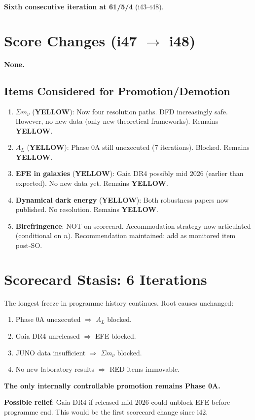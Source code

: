 \documentclass[11pt,a4paper]{article}
\newcommand{\YELLOW}{\textcolor{dfdyellow}{\textbf{YELLOW}}}
\begin{document}
\textbf{Sixth consecutive iteration at 61/5/4} (i43--i48).

\section{Score Changes (i47 $\to$ i48)}

\textbf{None.}

\subsection{Items Considered for Promotion/Demotion}

\begin{enumerate}
\item \textbf{$\Sigma m_\nu$} (\YELLOW): Now four resolution paths. DFD increasingly safe. However, no new data (only new theoretical frameworks). Remains \YELLOW.

\item \textbf{$A_L$} (\YELLOW): Phase 0A still unexecuted (7 iterations). Blocked. Remains \YELLOW.

\item \textbf{EFE in galaxies} (\YELLOW): Gaia DR4 possibly mid 2026 (earlier than expected). No new data yet. Remains \YELLOW.

\item \textbf{Dynamical dark energy} (\YELLOW): Both robustness papers now published. No resolution. Remains \YELLOW.

\item \textbf{Birefringence}: NOT on scorecard. Accommodation strategy now articulated (conditional on $n$). Recommendation maintained: add as monitored item post-SO.
\end{enumerate}

\section{Scorecard Stasis: 6 Iterations}

\begin{tcolorbox}[colback=red!5!white, colframe=red!60!black,
  title={SCORECARD FROZEN FOR 6 ITERATIONS (i43--i48) --- Structural Blockage}]

The longest freeze in programme history continues. Root causes unchanged:
\begin{enumerate}
\item Phase 0A unexecuted $\Rightarrow$ $A_L$ blocked.
\item Gaia DR4 unreleased $\Rightarrow$ EFE blocked.
\item JUNO data insufficient $\Rightarrow$ $\Sigma m_\nu$ blocked.
\item No new laboratory results $\Rightarrow$ RED items immovable.
\end{enumerate}

\textbf{The only internally controllable promotion remains Phase 0A.}

\textbf{Possible relief}: Gaia DR4 if released mid 2026 could unblock EFE before programme end. This would be the first scorecard change since i42.
\end{tcolorbox}
\end{document}
